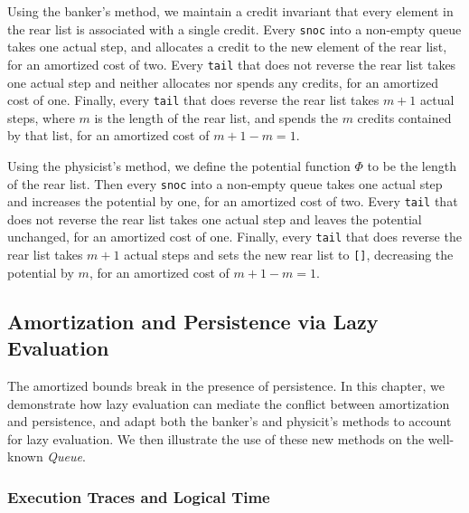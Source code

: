 \documentclass[12pt, a4paper]{article} %
\newcommand{\code}[1]{\texttt{#1}} %
\begin{document}
Using the banker's method, we maintain a credit invariant that every element in the rear list is associated with a single credit. Every \code{snoc} into a non-empty queue takes one actual step, and allocates a credit to the new element of the rear list, for an amortized cost of two. Every \code{tail} that does not reverse the rear list takes one actual step and neither allocates nor spends any credits, for an amortized cost of one. Finally, every \code{tail} that does reverse the rear list takes $m + 1$ actual steps, where $m$ is the length of the rear list, and spends the $m$ credits contained by that list, for an amortized cost of $m + 1 - m = 1$.

Using the physicist's method, we define the potential function $\Phi$ to be the length of the rear list. Then every \code{snoc} into a non-empty queue takes one actual step and increases the potential by one, for an amortized cost of two. Every \code{tail} that does not reverse the rear list takes one actual step and leaves the potential unchanged, for an amortized cost of one. Finally, every \code{tail} that does reverse the rear list takes $m+1$ actual steps and sets the new rear list to \code{[]}, decreasing the potential by $m$, for an amortized cost of $m + 1 - m = 1$.

















\newpage

\subsection{Amortization and Persistence via Lazy Evaluation}%
\label{sub:Amortization and Persistence via Lazy Evaluation}

The amortized bounds break in the presence of persistence. In this chapter, we demonstrate how lazy evaluation can mediate the conflict between amortization and persistence, and adapt both the banker's and physicit's methods to account for lazy evaluation. We then illustrate the use of these new methods on the well-known \textit{Queue}.

\subsubsection{Execution Traces and Logical Time}%
\end{document}
